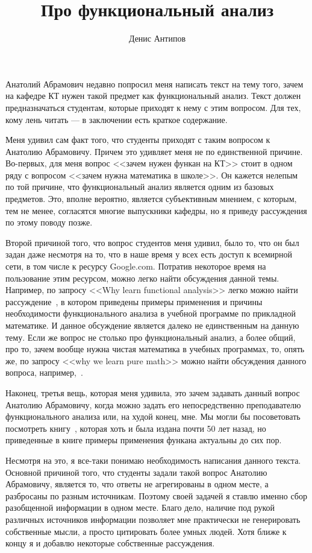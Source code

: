 \documentclass[russian]{article}
\title{Про функциональный анализ}
\author{Денис Антипов}
\begin{document}
\maketitle

Анатолий Абрамович недавно попросил меня написать текст на тему того, зачем на кафедре КТ нужен такой предмет как функциональный анализ. Текст должен предназначаться студентам, которые приходят к нему с этим вопросом. Для тех, кому лень читать --- в заключении есть краткое содержание.

Меня удивил сам факт того, что студенты приходят с таким вопросом к Анатолию Абрамовичу. Причем это удивляет меня не по единственной причине. Во-первых, для меня вопрос <<зачем нужен функан на КТ>> стоит в одном ряду с вопросом <<зачем нужна математика в школе>>. Он кажется нелепым по той причине, что функциональный анализ является одним из базовых предметов. Это, вполне вероятно, является субъективным мнением, с которым, тем не менее, согласятся многие выпускники кафедры, но я приведу рассуждения по этому поводу позже.

Второй причиной того, что вопрос студентов меня удивил, было то, что он был задан даже несмотря на то, что в наше время у всех есть доступ к всемирной сети, в том числе к ресурсу Google.com. Потратив некоторое время на пользование этим ресурсом, можно легко найти обсуждения данной темы. Например, по запросу <<Why learn functional analysis>> легко можно найти рассуждение~\cite{why-funcan}, в котором приведены примеры применения и причины необходимости функционального анализа в учебной программе по прикладной математике. И данное обсуждение является далеко не единственным на данную тему. Если же вопрос не столько про функциональный анализ, а более общий, про то, зачем вообще нужна чистая математика в учебных программах, то, опять же, по запросу <<why we learn pure math>> можно найти обсуждения данного вопроса, например,~\cite{why-pure-math}.

Наконец, третья вещь, которая меня удивила, это зачем задавать данный вопрос Анатолию Абрамовичу, когда можно задать его непосредственно преподавателю функционального анализа или, на худой конец, мне. Мы могли бы посоветовать посмотреть книгу~\cite{kollats}, которая хоть и была издана почти 50 лет назад, но приведенные в книге примеры применения функана актуальны до сих пор.

Несмотря на это, я все-таки понимаю необходимость написания данного текста. Основной причиной того, что студенты задали такой вопрос Анатолию Абрамовичу, является то, что ответы не агрегированы в одном месте, а разбросаны по разным источникам. Поэтому своей задачей я ставлю именно сбор разобщенной информации в одном месте. Благо дело, наличие под рукой различных источников информации позволяет мне практически не генерировать собственные мысли, а просто цитировать более умных людей. Хотя ближе к концу я и добавлю некоторые собственные рассуждения.
\end{document}
